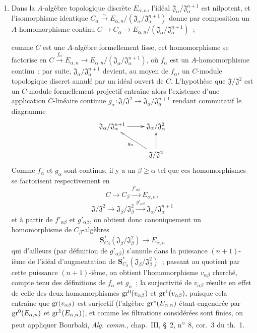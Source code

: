 \begin{env}[19.5.6.4]
\label{0.19.5.6.4-proof-fr}
\begin{enumerate}
  \item[\rm(i)] Dans la $A$-algèbre topologique discrète $E_{\alpha,n}$,
  l'idéal $\mathfrak J_\alpha/\mathfrak J_\alpha^{n+1}$ est nilpotent, et
  l'isomorphisme identique
  $C_\alpha\xrightarrow{\sim}
  E_{\alpha,n}/(\mathfrak J_\alpha/\mathfrak J_\alpha^{n+1})$ donne par
  composition un $A$-homomorphisme continu
  $C\to C_\alpha\to
  E_{\alpha,n}/(\mathfrak J_\alpha/\mathfrak J_\alpha^{n+1})$~;


  comme $C$ est une $A$-algèbre formellement lisse, cet homomorphisme se
  factorise en
  $C\xrightarrow{f_\alpha}E_{\alpha,n}\to
  E_{\alpha,n}/(\mathfrak J_\alpha/\mathfrak J_\alpha^{n+1})$, où $f_\alpha$
  est un $A$-homomorphisme continu~; par suite,
  $\mathfrak J_\alpha/\mathfrak J_\alpha^{n+1}$ devient, au moyen de
  $f_\alpha$, un $C$-module topologique discret annulé par un idéal ouvert de
  $C$. L'hypothèse que $\mathfrak J/\mathfrak J^2$ est un $C$-module
  formellement projectif entraîne alors l'existence d'une application
  $C$-linéaire continue
  $g_\alpha:\mathfrak J/\mathfrak J^2\to
  \mathfrak J_\alpha/\mathfrak J_\alpha^{n+1}$ rendant commutatif le diagramme
  \[
    \xymatrix{
      \mathfrak J_\alpha/\mathfrak J_\alpha^{n+1} \ar[r] &
      \mathfrak J_\alpha/\mathfrak J_\alpha^2 \\
      & \mathfrak J/\mathfrak J^2 \ar[ul]^{g_\alpha} \ar[u]
    }
  \]
  Comme $f_\alpha$ et $g_\alpha$ sont continus, il y a un
  $\beta\geq\alpha$ tel que ces homomorphismes se factorisent respectivement en
  \[
    C\to C_\beta\xrightarrow{f'_{\alpha\beta}}E_{\alpha,n},
  \]
  \[
    \mathfrak J/\mathfrak J^2\to
    \mathfrak J_\beta/\mathfrak J_\beta^2
    \xrightarrow{g'_{\alpha\beta}}
    \mathfrak J_\alpha/\mathfrak J_\alpha^{n+1}
  \]
  et à partir de $f'_{\alpha\beta}$ et $g'_{\alpha\beta}$, on obtient donc
  canoniquement un homomorphisme de $C_\beta$-algèbres
  \[
    \mathbf S_{C_\beta}^*(\mathfrak J_\beta/\mathfrak J_\beta^2)
    \longrightarrow E_{\alpha,n}
  \]
  qui d'ailleurs (par définition de $g'_{\alpha\beta}$) s'annule dans la
  puissance $(n+1)$-ième de l'idéal d'augmentation de
  $\mathbf S_{C_\beta}^*(\mathfrak J_\beta/\mathfrak J_\beta^2)$~; passant au
  quotient par cette puissance $(n+1)$-ième, on obtient l'homomorphisme
  $v_{\alpha\beta}$ cherché, compte tenu des définitions de $f_\alpha$ et
  $g_\alpha$~; la surjectivité de $v_{\alpha\beta}$ résulte en effet de celle
  des deux homomorphismes $\operatorname{gr}^0(v_{\alpha\beta})$ et
  $\operatorname{gr}^1(v_{\alpha\beta})$, puisque cela entraîne que
  $\operatorname{gr}(v_{\alpha\beta})$ est surjectif (l'algèbre
  $\operatorname{gr}^*(E_{\alpha,n})$ étant engendrée par $\operatorname{gr}^0(E_{\alpha,n})$ et
  $\operatorname{gr}^1(E_{\alpha,n})$), et comme les filtrations considérées sont finies, on
  peut appliquer Bourbaki, \emph{Alg. comm.}, chap.~III, §~2,
  n\textsuperscript{o}~8, cor.~3 du th.~1.


\end{enumerate}
\end{env}
